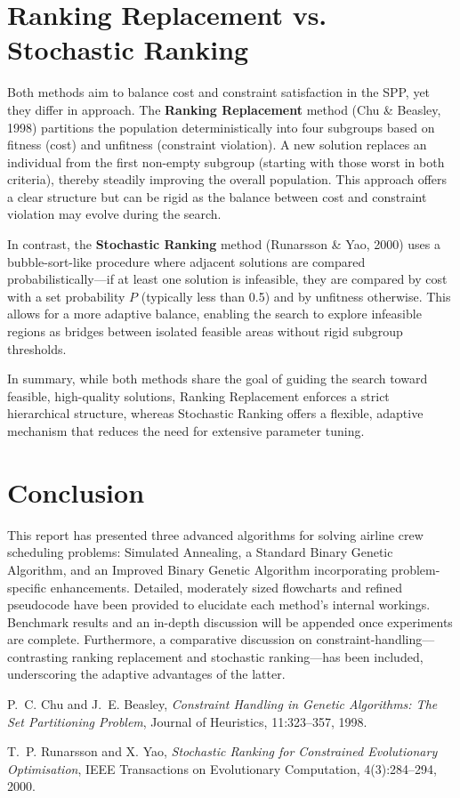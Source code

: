 \documentclass[12pt]{article}
\begin{document}
\newpage

\section{Ranking Replacement vs. Stochastic Ranking}
\label{sec:ranking}
Both methods aim to balance cost and constraint satisfaction in the SPP, yet they differ in approach. The \textbf{Ranking Replacement} method (Chu \& Beasley, 1998) partitions the population deterministically into four subgroups based on fitness (cost) and unfitness (constraint violation). A new solution replaces an individual from the first non-empty subgroup (starting with those worst in both criteria), thereby steadily improving the overall population. This approach offers a clear structure but can be rigid as the balance between cost and constraint violation may evolve during the search.

In contrast, the \textbf{Stochastic Ranking} method (Runarsson \& Yao, 2000) uses a bubble-sort-like procedure where adjacent solutions are compared probabilistically—if at least one solution is infeasible, they are compared by cost with a set probability \(P\) (typically less than 0.5) and by unfitness otherwise. This allows for a more adaptive balance, enabling the search to explore infeasible regions as bridges between isolated feasible areas without rigid subgroup thresholds.

In summary, while both methods share the goal of guiding the search toward feasible, high-quality solutions, Ranking Replacement enforces a strict hierarchical structure, whereas Stochastic Ranking offers a flexible, adaptive mechanism that reduces the need for extensive parameter tuning.
\section{Conclusion}
This report has presented three advanced algorithms for solving airline crew scheduling problems: Simulated Annealing, a Standard Binary Genetic Algorithm, and an Improved Binary Genetic Algorithm incorporating problem-specific enhancements. Detailed, moderately sized flowcharts and refined pseudocode have been provided to elucidate each method's internal workings. Benchmark results and an in-depth discussion will be appended once experiments are complete. Furthermore, a comparative discussion on constraint-handling—contrasting ranking replacement and stochastic ranking—has been included, underscoring the adaptive advantages of the latter.

\newpage

\begin{thebibliography}{9}
  P.~C. Chu and J.~E. Beasley, 
  \emph{Constraint Handling in Genetic Algorithms: The Set Partitioning Problem},
  Journal of Heuristics, 11:323--357, 1998.

  T.~P. Runarsson and X. Yao, 
  \emph{Stochastic Ranking for Constrained Evolutionary Optimisation},
  IEEE Transactions on Evolutionary Computation, 4(3):284--294, 2000.
\end{thebibliography}
\end{document}
